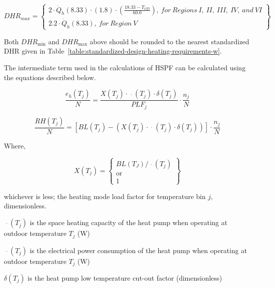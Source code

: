 \begin{equation}
  DHR_{max} =
  \left\{
    \begin{array}{l}
      {2 \cdot \dot{Q}_h}(8.33) \cdot (1.8) \cdot \left( {\frac{{18.33 - {T_{OD}}}}{{60.0}}} \right), {~for~Regions~I,~II,~III,~IV,~and~VI} \\
      {2.2 \cdot \dot{Q}_h}(8.33),{~for~Region~V}
    \end{array}
  \right\}
\end{equation}

Both \(DH{R_{\min }}\) and \(DH{R_{\max }}\) above should be rounded to the nearest standardized DHR given in Table~\ref{table:standardized-design-heating-requirements-w}.

The intermediate term used in the calculations of HSPF can be calculated using the equations described below.

\begin{equation}
\frac{{{e_h}({T_j})}}{N} = \frac{{X({T_j}) \cdot \mathop {{E_h}}\limits^ \cdot  ({T_j}) \cdot \delta ({T_j})}}{{PL{F_j}}} \cdot \frac{{{n_j}}}{N}
\end{equation}

\begin{equation}
\frac{{RH({T_j})}}{N} = \left[ {BL({T_j}) - \left( {X({T_j}) \cdot \mathop {{Q_h}}\limits^ \cdot  ({T_j}) \cdot \delta ({T_j})} \right)} \right] \cdot \frac{{{n_j}}}{N}
\end{equation}

Where,

\begin{equation}
X({T_j}) = \left\{
    \begin{array}{l}
      BL({T_J})/\mathop {{Q_h}}\limits^ \cdot  ({T_j}) \\
      {\mathrm{or}} \\
      1
    \end{array}
  \right\}
\end{equation}

whichever is less; the heating mode load factor for temperature bin \(j\), dimensionless.

\(\mathop {{Q_h}}\limits^ \cdot ({T_j})\) is the space heating capacity of the heat pump when operating at outdoor temperature \({T_j}\) (W)

\(\mathop {{E_h}}\limits^ \cdot ({T_j})\) is the electrical power consumption of the heat pump when operating at outdoor temperature \({T_j}\) (W)

\(\delta ({T_j})\) is the heat pump low temperature cut-out factor (dimensionless)

